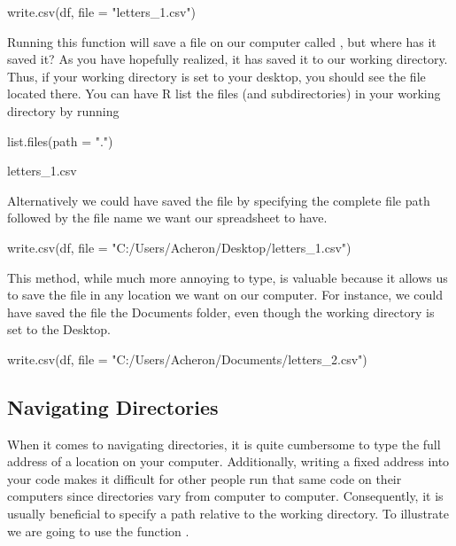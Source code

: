 \begin{inR}
write.csv(df, file = "letters_1.csv")
\end{inR}

\vspace{1em}

Running this function will save a file on our computer called , but where has it saved it? As you have hopefully realized, it has saved it to our working directory. Thus, if your working directory is set to your desktop, you should see the file  located there. You can have R list the files (and subdirectories) in your working directory by running

\begin{inR}
list.files(path = ".")
\end{inR}

\begin{outR}
[1] letters_1.csv
\end{outR}

Alternatively we could have saved the file by specifying the complete file path followed by the file name we want our spreadsheet to have.

\begin{inR}
write.csv(df, file = "C:/Users/Acheron/Desktop/letters_1.csv")
\end{inR}

\vspace{1em}

This method, while much more annoying to type, is valuable because it allows us to save the file in any location we want on our computer.  For instance, we could have saved the file the Documents folder, even though the working directory is set to the Desktop.

\begin{inR}
write.csv(df, file = "C:/Users/Acheron/Documents/letters_2.csv")
\end{inR}

\vspace{1em}

\subsection{Navigating Directories}

When it comes to navigating directories, it is quite cumbersome to type the full address of a location on your computer. Additionally, writing a fixed address into your code makes it difficult for other people run that same code on their computers since directories vary from computer to computer. Consequently, it is usually beneficial to specify a path relative to the working directory. To illustrate we are going to use the function .

